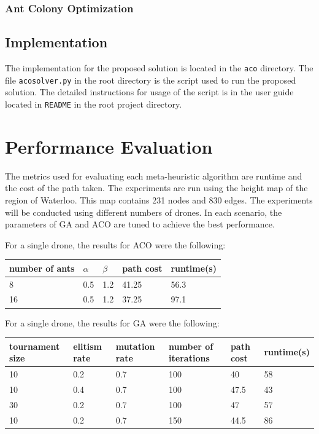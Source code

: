 \documentclass[conference]{IEEEtran}
\begin{document}
\subsubsection{Ant Colony Optimization}

\subsection{Implementation}
The implementation for the proposed solution is located in the \verb|aco| directory. The file \verb|acosolver.py| in the root directory is the script used to run the proposed solution. The detailed instructions for usage of the script is in the user guide located in \verb|README| in the root project directory. 

\section{Performance Evaluation}
The metrics used for evaluating each meta-heuristic algorithm are runtime and the cost of the path taken. The experiments are run using the height map of the region of Waterloo. This map contains 231 nodes and 830 edges. The experiments will be conducted using different numbers of drones. In each scenario, the parameters of GA and ACO are tuned to achieve the best performance. 

For a single drone, the results for ACO were the following:
\begin{center}
\begin{tabular}{ | m{1cm} | m{1cm}| m{1cm} | m{1.5cm} | m{1.5cm} |} 
\hline
number of ants & $\alpha$ & $\beta$ & path cost & runtime(s) \\ 
\hline
8 & 0.5 & 1.2 & 41.25 & 56.3 \\ 
\hline
16 & 0.5 & 1.2 & 37.25 &  97.1 \\ 
\hline
\end{tabular}
\end{center}

For a single drone, the results for GA were the following:
\begin{center}
\begin{tabular}{ | m{1.5cm} | m{1cm}| m{1cm} | m{1.5cm} | m{1.5cm} | m{1.5cm} |} 
\hline
tournament size & elitism rate & mutation rate & number of iterations & path cost & runtime(s) \\ 
\hline
10 & 0.2 & 0.7 & 100 & 40 & 58 \\ 
\hline
10 & 0.4 & 0.7 & 100 & 47.5 &  43  \\ 
\hline
30 & 0.2 & 0.7 & 100 & 47 &  57  \\ 
\hline
10 & 0.2 & 0.7 & 150 & 44.5 &  86  \\ 
\hline
\end{tabular}
\end{center}
\end{document}
